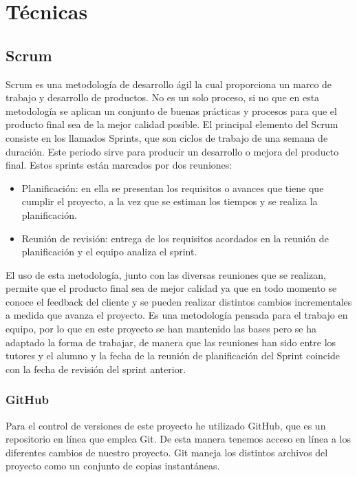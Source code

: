 


\section{Técnicas}

\subsection{Scrum}
Scrum es una metodología de desarrollo ágil la cual proporciona un marco de trabajo y desarrollo de productos. No es un solo proceso, si no que en esta metodología se aplican un conjunto de buenas prácticas y procesos para que el producto final sea de la mejor calidad posible.
El principal elemento del Scrum consiste en los llamados Sprints, que son ciclos de trabajo de una semana de duración. Este periodo sirve para producir un desarrollo o mejora del producto final. Estos sprints están marcados por dos reuniones:
\begin{itemize}
	\item Planificación: en ella se presentan los requisitos o avances que tiene que cumplir el proyecto, a la vez que se estiman los tiempos y se realiza la planificación.
	\item Reunión de revisión: entrega de los requisitos acordados en la reunión de planificación y el equipo analiza el sprint.
\end{itemize}
El uso de esta metodología, junto con las diversas reuniones que se realizan, permite que el producto final sea de mejor calidad ya que en todo momento se conoce el feedback del cliente y se pueden realizar distintos cambios incrementales a medida que avanza el proyecto.
Es una metodología pensada para el trabajo en equipo, por lo que en este proyecto se han mantenido las bases pero se ha adaptado la forma de trabajar, de manera que las reuniones han sido entre los tutores y el alumno y la fecha de la reunión de planificación del Sprint coincide con la fecha de revisión del sprint anterior.


\subsubsection{GitHub}
Para el control de versiones de este proyecto he utilizado GitHub, que es un repositorio en línea que emplea Git. De esta manera tenemos acceso en línea a los diferentes cambios de nuestro proyecto.
Git maneja los distintos archivos del proyecto como un conjunto de copias instantáneas. 


